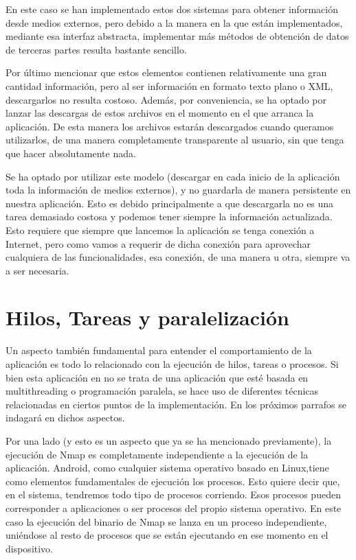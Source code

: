 En este caso se han implementado estos dos sistemas para obtener información desde medios externos, pero debido a la manera en la que están implementados, mediante esa interfaz abstracta, implementar más métodos de obtención de datos de terceras partes resulta bastante sencillo.

Por último mencionar que estos elementos contienen relativamente una gran cantidad información, pero al ser información en formato texto plano o XML, descargarlos no resulta costoso. Además, por conveniencia, se ha optado por lanzar las descargas de estos archivos en el momento en el que arranca la aplicación. De esta manera los archivos estarán descargados cuando queramos utilizarlos, de una manera completamente transparente al usuario, sin que tenga que hacer absolutamente nada.

Se ha optado por utilizar este modelo (descargar en cada inicio de la aplicación toda la información de medios externos), y no guardarla de manera persistente en nuestra aplicación. Esto es debido principalmente a que descargarla no es una tarea demasiado costosa y podemos tener siempre la información actualizada. Esto requiere que siempre que lancemos la aplicación se tenga conexión a Internet, pero como vamos a requerir de dicha conexión para aprovechar cualquiera de las funcionalidades, esa conexión, de una manera u otra, siempre va a ser necesaria.

\section{Hilos, Tareas y paralelización}

Un aspecto también fundamental para entender el comportamiento de la aplicación es todo lo relacionado con la ejecución de hilos, tareas o procesos. Si bien esta aplicación en no se trata de una aplicación que esté basada en multithreading o programación paralela, se hace uso de diferentes técnicas relacionadas en ciertos puntos de la implementación. En los próximos parrafos se indagará en dichos aspectos.

Por una lado (y esto es un aspecto que ya se ha mencionado previamente), la ejecución de Nmap es completamente independiente a la ejecución de la aplicación. Android, como cualquier sistema operativo basado en Linux,tiene como elementos fundamentales de ejecución los procesos. Esto quiere decir que, en el sistema, tendremos todo tipo de procesos corriendo. Esos procesos pueden corresponder a aplicaciones o ser procesos del propio sistema operativo. En este caso la ejecución del binario de Nmap se lanza en un proceso independiente, uniéndose al resto de procesos que se están ejecutando en ese momento en el dispositivo.

